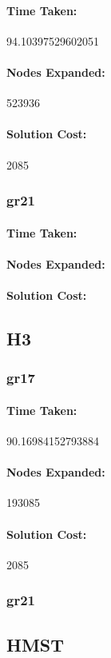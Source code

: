 \documentclass[11pt]{article}
\begin{document}
\paragraph{Time Taken:}94.10397529602051
\paragraph{Nodes Expanded:}523936
\paragraph{Solution Cost:}2085
\subsubsection{gr21}
\paragraph{Time Taken:}
\paragraph{Nodes Expanded:}
\paragraph{Solution Cost:}
\subsection{H3}
\subsubsection{gr17}
\paragraph{Time Taken:}90.16984152793884
\paragraph{Nodes Expanded:}193085
\paragraph{Solution Cost:}2085
\subsubsection{gr21}
\subsection{HMST}
\end{document}
